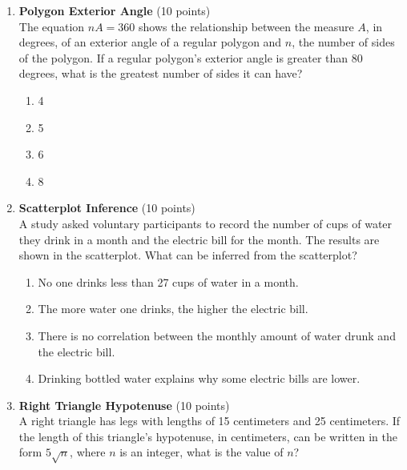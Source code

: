\begin{enumerate}
\begin{subanswer}
    The store sold 57 board games.
    
    Answer: D
  \end{subanswer}


  \item \textbf{Polygon Exterior Angle} (10 points)\\
  The equation $nA = 360$ shows the relationship between the measure $A$, in degrees, of an exterior angle of a regular polygon and $n$, the number of sides of the polygon. If a regular polygon's exterior angle is greater than 80 degrees, what is the greatest number of sides it can have?
  \begin{enumerate}[label=(\Alph*)]
    \item 4
    \item 5
    \item 6
    \item 8
  \end{enumerate}
  \begin{subanswer}
  \end{subanswer}




  \newpage


  \item \textbf{Scatterplot Inference} (10 points)\\
  A study asked voluntary participants to record the number of cups of water they drink in a month and the electric bill for the month. The results are shown in the scatterplot. What can be inferred from the scatterplot?
  \begin{enumerate}[label=(\Alph*)]
    \item No one drinks less than 27 cups of water in a month.
    \item The more water one drinks, the higher the electric bill.
    \item There is no correlation between the monthly amount of water drunk and the electric bill.
    \item Drinking bottled water explains why some electric bills are lower.
  \end{enumerate}
  \begin{subanswer}
  \end{subanswer}

  \item \textbf{Right Triangle Hypotenuse} (10 points)\\
  A right triangle has legs with lengths of 15 centimeters and 25 centimeters. If the length of this triangle's hypotenuse, in centimeters, can be written in the form $5\sqrt{n}$, where $n$ is an integer, what is the value of $n$?
  \begin{subanswer}
  \end{subanswer}




\end{enumerate}
